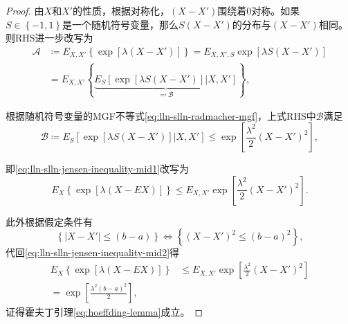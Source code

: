 \begin{proof}
由$X$和$X'$的性质，根据对称化，$\left( X - X' \right)$围绕着$0$对称。如果$S \in \left\{ -1,1\right\}$是一个随机符号变量，那么$S \left( X - X' \right)$的分布与$\left( X - X' \right)$相同。则RHS进一步改写为
\begin{equation*}
  \begin{split}
    \mathcal{A} & \coloneqq E_{X,X'} \left\{
    \exp \left[
    \lambda \left( X - X' \right)
    \right]
    \right\}
    = E_{X,X',S} \exp \left[ \lambda S \left( X - X' \right) \right] \\
    & = E_{X,X'} \left\{
    \underbrace{
    E_{S}
    \left[
    \exp \left[ \lambda S \left( X - X' \right) \right]
    | X,X'
    \right]
    }_{\eqqcolon \mathcal{B}}
    \right\},
  \end{split}
\end{equation*}

根据随机符号变量的MGF不等式\eqref{eq:lln-slln-radmacher-mgf}，上式RHS中$\mathcal{B}$满足
\begin{equation*}
  \mathcal{B} \coloneqq     E_{S}
      \left[
      \exp \left[ \lambda S \left( X - X' \right) \right]
      | X,X'
      \right]
      \le \exp
      \left[
      \frac{\lambda^{2}}{2}
      \left( X - X' \right)^{2}
      \right],
\end{equation*}

即\eqref{eq:lln-slln-jensen-inequality-mid1}改写为
\begin{equation}
  \label{eq:lln-slln-jensen-inequality-mid2}
  E_{X} \left\{
  \exp \left[ \lambda \left( X - E X \right)\right]
  \right\}
  \le E_{X,X'}
  \exp
  \left[
  \frac{\lambda^{2}}{2}
  \left( X - X' \right)^{2}
  \right].
\end{equation}

此外根据假定条件有
\begin{equation*}
  \left\{ \left| X - X' \right| \le \left( b - a \right) \right\}
  \Longleftrightarrow
  \left\{
  \left( X - X' \right)^{2} \le \left( b - a \right)^{2}
  \right\},
\end{equation*}
代回\eqref{eq:lln-slln-jensen-inequality-mid2}得
\begin{equation*}
  \begin{split}
    E_{X} \left\{
    \exp \left[ \lambda \left( X - E X \right)\right]
    \right\}
    & \le E_{X,X'}
    \exp
    \left[
    \frac{\lambda^{2}}{2}
    \left( X - X' \right)^{2}
    \right] \\
    = \exp \left[
    \frac{\lambda^{2} \left( b -a \right)^{2}}{2}
    \right],
  \end{split}
\end{equation*}
证得霍夫丁引理\eqref{eq:hoeffding-lemma}成立。
\end{proof}

